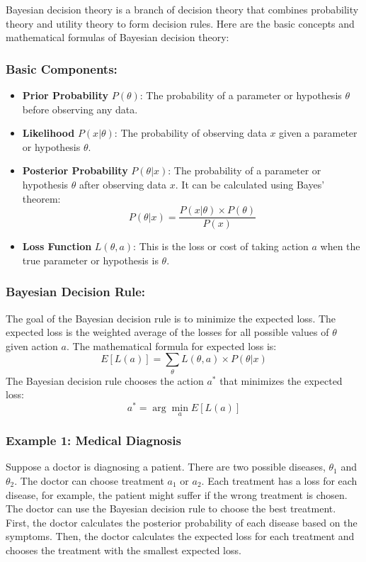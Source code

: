 \documentclass{article}
\begin{document}
Bayesian decision theory is a branch of decision theory that combines probability theory and utility theory to form decision rules. Here are the basic concepts and mathematical formulas of Bayesian decision theory:

\subsubsection{Basic Components:}
\begin{itemize}
    \item \textbf{Prior Probability} \( P(\theta) \): The probability of a parameter or hypothesis \( \theta \) before observing any data.
    \item \textbf{Likelihood} \( P(x|\theta) \): The probability of observing data \( x \) given a parameter or hypothesis \( \theta \).
    \item \textbf{Posterior Probability} \( P(\theta|x) \): The probability of a parameter or hypothesis \( \theta \) after observing data \( x \). It can be calculated using Bayes' theorem:
    \[ P(\theta|x) = \frac{P(x|\theta) \times P(\theta)}{P(x)} \]
    \item \textbf{Loss Function} \( L(\theta, a) \): This is the loss or cost of taking action \( a \) when the true parameter or hypothesis is \( \theta \).
\end{itemize}

\subsubsection{Bayesian Decision Rule:}
The goal of the Bayesian decision rule is to minimize the expected loss. The expected loss is the weighted average of the losses for all possible values of \( \theta \) given action \( a \). The mathematical formula for expected loss is:
\[ E[L(a)] = \sum_{\theta} L(\theta, a) \times P(\theta|x) \]
The Bayesian decision rule chooses the action \( a^* \) that minimizes the expected loss:
\[ a^* = \arg\min_a E[L(a)] \]

\subsubsection{Example 1: Medical Diagnosis}
Suppose a doctor is diagnosing a patient. There are two possible diseases, \( \theta_1 \) and \( \theta_2 \). The doctor can choose treatment \( a_1 \) or \( a_2 \). Each treatment has a loss for each disease, for example, the patient might suffer if the wrong treatment is chosen. The doctor can use the Bayesian decision rule to choose the best treatment. First, the doctor calculates the posterior probability of each disease based on the symptoms. Then, the doctor calculates the expected loss for each treatment and chooses the treatment with the smallest expected loss.
\end{document}
